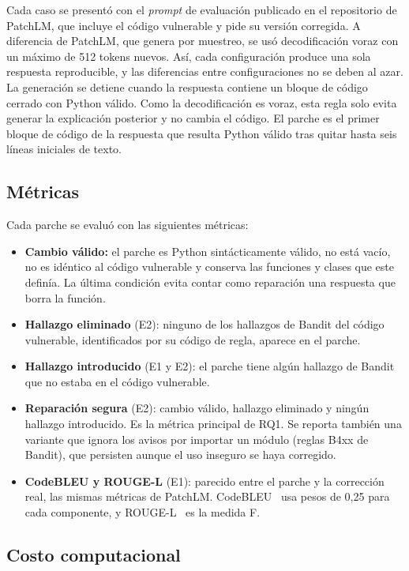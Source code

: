 \documentclass[conference]{IEEEtran}
\begin{document}
Cada caso se presentó con el \emph{prompt} de evaluación publicado en el repositorio de PatchLM, que incluye el código vulnerable y pide su versión corregida. A diferencia de PatchLM, que genera por muestreo, se usó decodificación voraz con un máximo de 512 tokens nuevos. Así, cada configuración produce una sola respuesta reproducible, y las diferencias entre configuraciones no se deben al azar. La generación se detiene cuando la respuesta contiene un bloque de código cerrado con Python válido. Como la decodificación es voraz, esta regla solo evita generar la explicación posterior y no cambia el código. El parche es el primer bloque de código de la respuesta que resulta Python válido tras quitar hasta seis líneas iniciales de texto.

\subsection{Métricas}

Cada parche se evaluó con las siguientes métricas:

\begin{itemize}
\item \textbf{Cambio válido:} el parche es Python sintácticamente válido, no está vacío, no es idéntico al código vulnerable y conserva las funciones y clases que este definía. La última condición evita contar como reparación una respuesta que borra la función.
\item \textbf{Hallazgo eliminado} (E2): ninguno de los hallazgos de Bandit del código vulnerable, identificados por su código de regla, aparece en el parche.
\item \textbf{Hallazgo introducido} (E1 y E2): el parche tiene algún hallazgo de Bandit que no estaba en el código vulnerable.
\item \textbf{Reparación segura} (E2): cambio válido, hallazgo eliminado y ningún hallazgo introducido. Es la métrica principal de RQ1. Se reporta también una variante que ignora los avisos por importar un módulo (reglas B4xx de Bandit), que persisten aunque el uso inseguro se haya corregido.
\item \textbf{CodeBLEU y ROUGE-L} (E1): parecido entre el parche y la corrección real, las mismas métricas de PatchLM. CodeBLEU~\cite{ren2020codebleu} usa pesos de 0,25 para cada componente, y ROUGE-L~\cite{lin2004rouge} es la medida F.
\end{itemize}

\subsection{Costo computacional}
\end{document}
